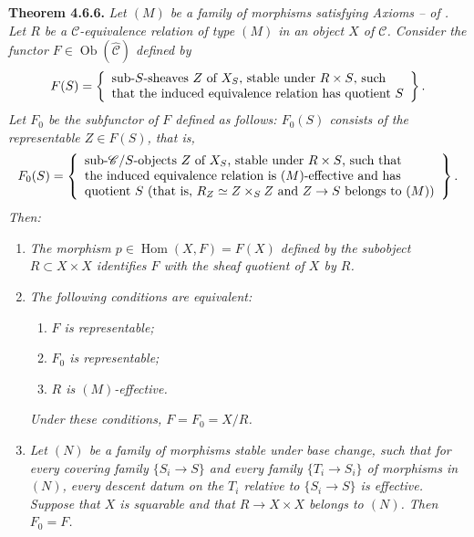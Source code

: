 \medskip
\noindent{}\textbf{Theorem 4.6.6.}
\textit{Let \((M)\) be a family of morphisms satisfying Axioms
-- of . Let \(R\) be a
\(\mathscr C\)-equivalence relation of type \((M)\) in an
object \(X\) of \(\mathscr C\). Consider the functor
\(F\in\operatorname{Ob}(\widehat{\mathscr C})\) defined by}
\[
 F(S)=\left\{\begin{array}{l}
 \text{sub-\(S\)-sheaves \(Z\) of \(X_S\), stable under \(R\times S\), such}\cr
 \text{that the induced equivalence relation has quotient \(S\)}
 \end{array}\right\}.
\]
\textit{Let \(F_0\) be the subfunctor of \(F\) defined as follows:
\(F_0(S)\) consists of the representable \(Z\in F(S)\), that is,}
\[
 F_0(S)=\left\{\begin{array}{l}
 \text{sub-\(\mathscr C/S\)-objects \(Z\) of \(X_S\), stable under
 \(R\times S\), such that}\cr
 \text{the induced equivalence relation is \((M)\)-effective and has}\cr
 \text{quotient \(S\) (that is, \(R_Z\simeq Z\times_S Z\) and \(Z\to S\)
 belongs to \((M)\))}
 \end{array}\right\}.
\]
\textit{Then:}
\begin{enumerate}
 \item[(i)] \textit{The morphism
 \(p\in\operatorname{Hom}(X,F)=F(X)\) defined by the subobject
 \(R\subset X\times X\) identifies \(F\) with the sheaf quotient of
 \(X\) by \(R\).}
 \item[(ii)] \textit{The following conditions are equivalent:}
 \begin{enumerate}
  \item[(a)] \textit{\(F\) is representable;}
  \item[(b)] \textit{\(F_0\) is representable;}
  \item[(c)] \textit{\(R\) is \((M)\)-effective.}
 \end{enumerate}
 \textit{Under these conditions, \(F=F_0=X/R\).}
 \item[(iii)] \textit{Let \((N)\) be a family of morphisms stable under
 base change, such that for every covering family \(\{S_i\to S\}\) and
 every family \(\{T_i\to S_i\}\) of morphisms in \((N)\), every
 descent datum on the \(T_i\) relative to \(\{S_i\to S\}\) is
 effective. Suppose that \(X\) is squarable and that
 \(R\to X\times X\) belongs to \((N)\). Then \(F_0=F\).}
\end{enumerate}

